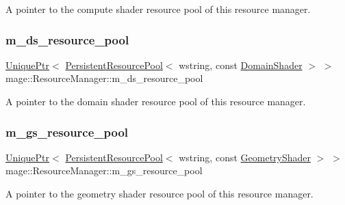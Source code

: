 A pointer to the compute shader resource pool of this resource manager. \hypertarget{classmage_1_1_resource_manager_aa58be0018fe4f93182927a84bca407f4}{}\label{classmage_1_1_resource_manager_aa58be0018fe4f93182927a84bca407f4} 
\subsubsection{\texorpdfstring{m\+\_\+ds\+\_\+resource\+\_\+pool}{m\_ds\_resource\_pool}}
{\footnotesize\ttfamily \hyperlink{namespacemage_a3316d7143a973e37adf1110f2e80ca31}{Unique\+Ptr}$<$ \hyperlink{classmage_1_1_persistent_resource_pool}{Persistent\+Resource\+Pool}$<$ wstring, const \hyperlink{namespacemage_ad5d9bb50a2b73d471275badcd9b2f155}{Domain\+Shader} $>$ $>$ mage\+::\+Resource\+Manager\+::m\+\_\+ds\+\_\+resource\+\_\+pool\hspace{0.3cm}{\ttfamily [private]}}

A pointer to the domain shader resource pool of this resource manager. \hypertarget{classmage_1_1_resource_manager_a2b0c4dfc6473c6c8aa9a0f3ebc30c1dd}{}\label{classmage_1_1_resource_manager_a2b0c4dfc6473c6c8aa9a0f3ebc30c1dd} 
\subsubsection{\texorpdfstring{m\+\_\+gs\+\_\+resource\+\_\+pool}{m\_gs\_resource\_pool}}
{\footnotesize\ttfamily \hyperlink{namespacemage_a3316d7143a973e37adf1110f2e80ca31}{Unique\+Ptr}$<$ \hyperlink{classmage_1_1_persistent_resource_pool}{Persistent\+Resource\+Pool}$<$ wstring, const \hyperlink{namespacemage_abb3c4ec904feaa4f076ab736f6bab40f}{Geometry\+Shader} $>$ $>$ mage\+::\+Resource\+Manager\+::m\+\_\+gs\+\_\+resource\+\_\+pool\hspace{0.3cm}{\ttfamily [private]}}

A pointer to the geometry shader resource pool of this resource manager. \hypertarget{classmage_1_1_resource_manager_a8f5118a694baef442f467ef8658f93b6}{}\label{classmage_1_1_resource_manager_a8f5118a694baef442f467ef8658f93b6} 
